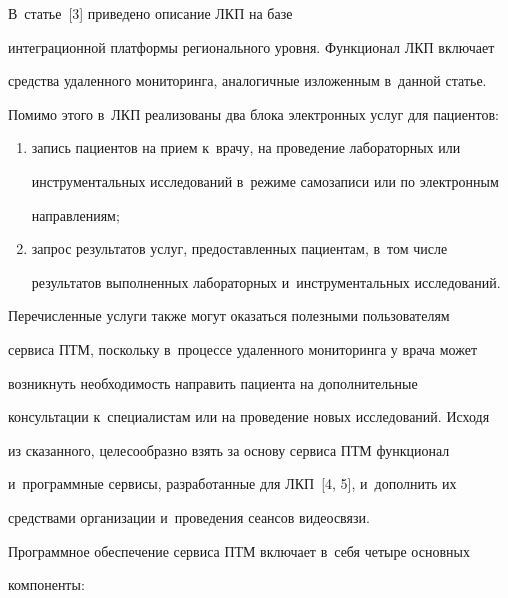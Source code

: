   В~статье~[3] приведено описание ЛКП на базе 


интеграционной платформы регионального уровня. Функционал ЛКП включает 


средства удаленного мониторинга, аналогичные изложенным в~данной статье. 


Помимо этого в~ЛКП реализованы два блока электронных услуг для пациентов:


  \begin{enumerate}[(1)]


\item запись пациентов на прием к~врачу, на проведение лабораторных или 


инструментальных исследований в~режиме самозаписи или по электронным 


направлениям;


\item запрос результатов услуг, предоставленных пациентам, в~том числе 


результатов выполненных лабораторных и~инструментальных исследований.


\end{enumerate}


  


  Перечисленные услуги также могут оказаться полезными пользователям 


сервиса ПТМ, поскольку в~процессе удаленного мониторинга у врача может 


возникнуть необходимость направить пациента на дополнительные 


консультации к~специалистам или на проведение новых исследований. Исходя 


из сказанного, целесообразно взять за основу сервиса ПТМ функционал 


и~программные сервисы, разработанные для ЛКП~[4, 5], и~дополнить их 


средствами организации и~проведения сеансов видеосвязи.


  


  Программное обеспечение сервиса ПТМ включает в~себя четыре основных 


компоненты:


